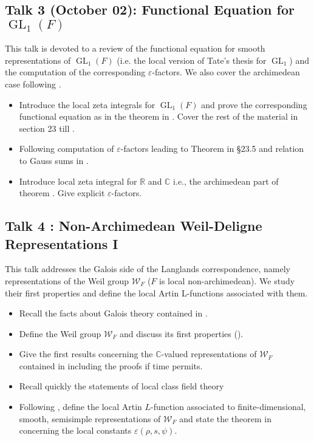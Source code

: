 \documentclass[11pt]{amsart}
\DeclareMathOperator{\Gl}{GL}
\newcommand{\R}{\mathbb{R}}
\newcommand{\C}{\mathbb{C}}
\begin{document}
\subsection{Talk 3 (October 02): Functional Equation for $\Gl_1(F)$}
This talk is devoted to a review of the functional equation for smooth representations of $\Gl_1(F)$ (i.e. the local version of Tate’s thesis for $\Gl_1$) and the computation of the corresponding $\varepsilon$-factors. We also cover the archimedean case following \cite[Ch 7]{RV99}.
    \begin{itemize}
        \item Introduce the local zeta integrals for $\Gl_1(F)$ and prove the corresponding functional equation as in the theorem in \cite[\S 23.1-23.2]{BH06}. Cover the rest of the material in section 23 till \cite[\S 23.4]{BH06}.
        \item Following \cite[\S 23.5-23.7]{BH06} computation of $\varepsilon$-factors leading to Theorem in \S 23.5 and relation to Gauss sums in \cite[\S 23.6]{BH06}.
        \item Introduce local zeta integral for $\R$ and $\C$ i.e., the archimedean part of theorem \cite[Ch 7, Thm 7.2]{RV99}. Give explicit $\varepsilon$-factors. 
    \end{itemize}

\subsection{Talk 4 : Non-Archimedean Weil-Deligne Representations I}
This talk addresses the Galois side of the Langlands correspondence, namely representations
of the Weil group $\mathcal{W}_F$ ($F$ is local non-archimedean). We study their first properties and define the local Artin L-functions
associated with them.
\begin{itemize}
    \item Recall the facts about Galois theory contained in \cite[\S 28.1-28.3]{BH06}.
    \item Define the Weil group $\mathcal{W}_F$ and discuss its first properties (\cite[\S 28.4-28.5]{BH06}).
    \item Give the first results concerning the $\C$-valued representations of $\mathcal{W}_F$ contained in \cite[\S 28.6-28.7]{BH06} including the proofs if time permits.
    \item Recall quickly the statements of local class field theory \cite[\S 29.1]{BH06}
    \item Following \cite[\S 29.2-29.4]{BH06}, define the local Artin $L$-function associated to finite-dimensional, smooth, semisimple representations of $\mathcal{W}_F$ and state the theorem in \cite[\S 29.4]{BH06} concerning the local constants $\varepsilon(\rho,s,\psi)$.
\end{itemize}
\end{document}
